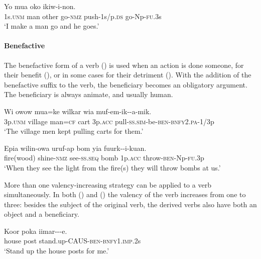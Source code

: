 \ea%
\label{ex:x1873}
\gll Yo mua oko   ikiw-i-non. \\
1s.\textsc{unm} man other go-\textsc{nmz} push-1s/p.\textsc{ds} go-Np-\textsc{fu}.3s\\
\glt`I make a man go and he goes.'
\z

\paragraph[ Benefactive]{ Benefactive}
{}
The benefactive form of a verb () is used when an action is done someone, for their benefit (), or in some cases for their detriment (). With the addition of the benefactive suffix to the verb, the beneficiary becomes an obligatory argument. The beneficiary is always animate, and usually human. 

\ea%
\label{ex:x1004}
\gll Wi owow mua=ke wilkar wia muf-em-ik--a-mik.\\
3p.\textsc{unm} village man=\textsc{cf} cart 3p.\textsc{acc} pull-\textsc{ss}.\textsc{sim}-be-\textsc{ben}-\textsc{bnfy}2.\textsc{pa}-1/3p\\
\glt`The village men kept pulling carts for them.'
\z

\ea%
\label{ex:x1005}
\gll Epia wilin-owa uruf-ap bom yia fuurk--i-kuan.\\
fire(wood) shine-\textsc{nmz} see-\textsc{ss}.\textsc{seq} bomb 1p.\textsc{acc} throw-\textsc{ben}-Np-\textsc{fu}.3p\\
\glt`When they see the light from the fire(s) they will throw bombs at us.'
\z

More than one valency-increasing strategy can be applied to a verb simultaneously. In both () and () the valency of the verb increases from one to three: besides the subject of the original verb, the derived verbs also have both an object and a beneficiary.

\ea%
\label{ex:x1007}
\gll Koor poka iimar---e. \\
house post stand.up-CAUS-\textsc{ben}-\textsc{bnfy}1.\textsc{imp}.2s\\
\glt`Stand up the house posts for me.'
\z

